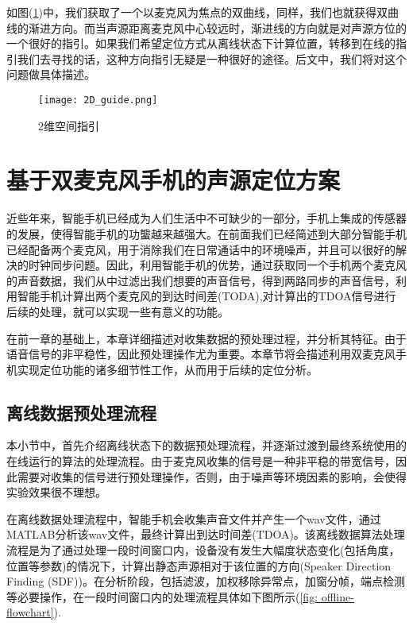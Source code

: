 \documentclass[winfonts]{njuthesis}
\begin{document}
		如图(\ref{fig: 2D_guide})中，我们获取了一个以麦克风为焦点的双曲线，同样，我们也就获得双曲线的渐进方向。而当声源距离麦克风中心较远时，渐进线的方向就是对声源方位的一个很好的指引。如果我们希望定位方式从离线状态下计算位置，转移到在线的指引我们去寻找的话，这种方向指引无疑是一种很好的途径。后文中，我们将对这个问题做具体描述。
		
		\begin{figure}[H]
			\centering
			\texttt{[image: 2D\_guide.png]} 
			\caption{2维空间指引}
			\label{fig: 2D_guide}
		\end{figure}
	
\chapter{基于双麦克风手机的声源定位方案}\label{chapter_work}
	
	近些年来，智能手机已经成为人们生活中不可缺少的一部分，手机上集成的传感器的发展，使得智能手机的功螚越来越强大。在前面我们已经简述到大部分智能手机已经配备两个麦克风，用于消除我们在日常通话中的环境噪声，并且可以很好的解决的时钟同步问题。因此，利用智能手机的优势，通过获取同一个手机两个麦克风的声音数据，我们从中过滤出我们想要的声音信号，得到两路同步的声音信号，利用智能手机计算出两个麦克风的到达时间差(TODA),对计算出的TDOA信号进行后续的处理，就可以实现一些有意义的功能。
	
	在前一章的基础上，本章详细描述对收集数据的预处理过程，并分析其特征。由于语音信号的非平稳性，因此预处理操作尤为重要。本章节将会描述利用双麦克风手机实现定位功能的诸多细节性工作，从而用于后续的定位分析。
	
	\section{离线数据预处理流程}
	
		本小节中，首先介绍离线状态下的数据预处理流程，并逐渐过渡到最终系统使用的在线运行的算法的处理流程。由于麦克风收集的信号是一种非平稳的带宽信号，因此需要对收集的信号进行预处理操作，否则，由于噪声等环境因素的影响，会使得实验效果很不理想。
		
		在离线数据处理流程中，智能手机会收集声音文件并产生一个wav文件，通过MATLAB分析该wav文件，最终计算出到达时间差(TDOA)。该离线数据算法处理流程是为了通过处理一段时间窗口内，设备没有发生大幅度状态变化(包括角度，位置等参数)的情况下，计算出静态声源相对于该位置的方向(Speaker Direction Finding (SDF))。在分析阶段，包括滤波，加权移除异常点，加窗分帧，端点检测等必要操作，在一段时间窗口内的处理流程具体如下图所示(\ref{fig: offline-flowchart}).
		
\end{document}
